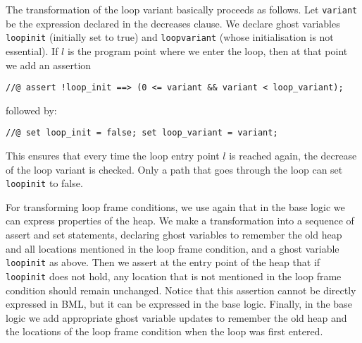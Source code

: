 The transformation of the loop variant basically proceeds as follows.
Let \texttt{variant} be the expression declared in the decreases
clause.  We declare ghost variables \texttt{loop\unsc init} (initially
set to true) and \texttt{loop\unsc variant} (whose initialisation is
not essential). If \(l\) is the program point where we enter the loop,
then at that point we add an assertion
\begin{verbatim}
//@ assert !loop_init ==> (0 <= variant && variant < loop_variant);
\end{verbatim}
followed by:
\begin{verbatim}
//@ set loop_init = false; set loop_variant = variant;
\end{verbatim}
This ensures that every time the loop entry point \(l\) is reached
again, the decrease of the loop variant is checked. Only a path that
goes through the loop can set \texttt{loop\unsc init} to false.

For transforming loop frame conditions, we use again that in the
\mobius base logic we can express properties of the heap. 
We make a transformation into a sequence of assert and set
statements, declaring ghost variables to remember the old heap and
all locations mentioned in the loop frame condition, and a ghost
variable \texttt{loop\unsc init} as above. Then we assert at the entry
point of the heap that if \texttt{loop\unsc init} does not hold, any
location that is not mentioned in the loop frame condition should
remain unchanged. Notice that this assertion cannot be directly
expressed in BML, but it can be expressed in the \mobius base
logic. Finally, in the \mobius base logic we add appropriate ghost
variable updates to remember the old heap and the locations of the
loop frame condition when the loop was first entered.










